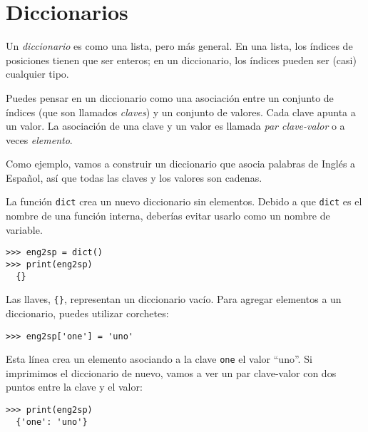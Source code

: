 \hypertarget{diccionarios}{%
\section{Diccionarios}\label{diccionarios}}

 

   
\index{}

Un \emph{diccionario} es como una lista, pero más general. En una lista,
los índices de posiciones tienen que ser enteros; en un diccionario, los
índices pueden ser (casi) cualquier tipo.

Puedes pensar en un diccionario como una asociación entre un conjunto de
índices (que son llamados \emph{claves}) y un conjunto de valores. Cada
clave apunta a un valor. La asociación de una clave y un valor es
llamada \emph{par clave-valor} o a veces \emph{elemento}.

Como ejemplo, vamos a construir un diccionario que asocia palabras de
Inglés a Español, así que todas las claves y los valores son cadenas.

La función \texttt{dict} crea un nuevo diccionario sin elementos. Debido
a que \texttt{dict} es el nombre de una función interna, deberías evitar
usarlo como un nombre de variable.

 


\begin{Verbatim}[frame=single]
>>> eng2sp = dict()
>>> print(eng2sp)
  {}
\end{Verbatim}


Las llaves, \texttt{\{\}}, representan un diccionario vacío. Para
agregar elementos a un diccionario, puedes utilizar corchetes:

 


\begin{Verbatim}[frame=single]
>>> eng2sp['one'] = 'uno'
\end{Verbatim}


Esta línea crea un elemento asociando a la clave
\texttt{\textquotesingle{}one\textquotesingle{}} el valor ``uno''. Si
imprimimos el diccionario de nuevo, vamos a ver un par clave-valor con
dos puntos entre la clave y el valor:


\begin{Verbatim}[frame=single]
>>> print(eng2sp)
  {'one': 'uno'}
\end{Verbatim}


